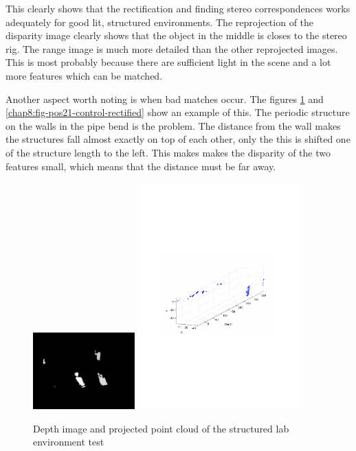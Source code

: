 This clearly shows that the rectification and finding stereo correspondences
works adequately for good lit, structured
environments. The reprojection of the disparity image clearly shows that the object in the
middle is closes to the stereo rig. The range image is much more detailed than the other
reprojected images. This is most probably
because there are sufficient light in the scene and a lot more features which can be
matched.

Another aspect worth noting is when bad matches occur. The figures
\ref{chap8:fig-pos21-control-depth} and \ref{chap8:fig-pos21-control-rectified} show an
example of this. The periodic structure on the walls in the pipe bend is the problem. The
distance from the wall makes the structures fall almost exactly on top of each other, only
the this is shifted one of the structure length to the left. This makes makes the
disparity of the two features small, which means that the distance must be far away. 
\begin{figure}[htbp]
    \centering
    \includegraphics[width=0.35\textwidth]{pics/pos21-control-depth}
    \includegraphics[width=0.55\textwidth]{pics/pos21-control-3d}
    \caption{Depth image and projected point cloud of the structured lab environment test}
    \label{chap8:fig-pos21-control-depth}
\end{figure}
